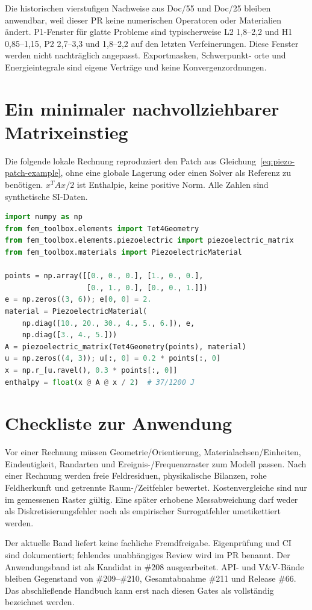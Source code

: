 Die historischen vierstufigen Nachweise aus Doc/55 und Doc/25 bleiben anwendbar,
weil dieser PR keine numerischen Operatoren oder Materialien ändert.
P1-Fenster für glatte Probleme sind typischerweise L2 1,8--2,2 und H1
0,85--1,15, P2 2,7--3,3 und 1,8--2,2 auf den letzten Verfeinerungen.
Diese Fenster werden nicht nachträglich angepasst. Exportmasken, Schwerpunkt-
orte und Energieintegrale sind eigene Verträge und keine Konvergenzordnungen.

\section{Ein minimaler nachvollziehbarer Matrixeinstieg}
Die folgende lokale Rechnung reproduziert den Patch aus
Gleichung~\ref{eq:piezo-patch-example}, ohne eine globale Lagerung oder einen
Solver als Referenz zu benötigen. $x^T A x/2$ ist Enthalpie, keine positive Norm.
Alle Zahlen sind synthetische SI-Daten.
\begin{lstlisting}[language=Python,caption={Lokale Enthalpie des affinen Piezo-Patches.},label={code:piezo-patch}]
import numpy as np
from fem_toolbox.elements import Tet4Geometry
from fem_toolbox.elements.piezoelectric import piezoelectric_matrix
from fem_toolbox.materials import PiezoelectricMaterial

points = np.array([[0., 0., 0.], [1., 0., 0.],
                   [0., 1., 0.], [0., 0., 1.]])
e = np.zeros((3, 6)); e[0, 0] = 2.
material = PiezoelectricMaterial(
    np.diag([10., 20., 30., 4., 5., 6.]), e,
    np.diag([3., 4., 5.]))
A = piezoelectric_matrix(Tet4Geometry(points), material)
u = np.zeros((4, 3)); u[:, 0] = 0.2 * points[:, 0]
x = np.r_[u.ravel(), 0.3 * points[:, 0]]
enthalpy = float(x @ A @ x / 2)  # 37/1200 J
\end{lstlisting}

\section{Checkliste zur Anwendung}
Vor einer Rechnung müssen Geometrie/Orientierung, Materialachsen/Einheiten,
Eindeutigkeit, Randarten und Ereignis-/Frequenzraster zum Modell passen.
Nach einer Rechnung werden freie Feldresiduen, physikalische Bilanzen,
rohe Feldherkunft und getrennte Raum-/Zeitfehler bewertet.
Kostenvergleiche sind nur im gemessenen Raster gültig.
Eine später erhobene Messabweichung darf weder als Diskretisierungsfehler noch
als empirischer Surrogatfehler umetikettiert werden.

Der aktuelle Band liefert keine fachliche Fremdfreigabe. Eigenprüfung und
CI sind dokumentiert; fehlendes unabhängiges Review wird im PR benannt.
Der Anwendungsband ist als Kandidat in \#208 ausgearbeitet.
API- und V\&V-Bände bleiben Gegenstand von \#209--\#210,
Gesamtabnahme \#211 und Release \#66. Das abschließende Handbuch kann erst nach
diesen Gates als vollständig bezeichnet werden.
